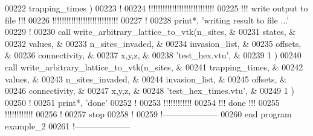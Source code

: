 \begin{DoxyCode}
00222                                           trapping\_times     )
00223 \textcolor{comment}{!}
00224 \textcolor{comment}{!!!!!!!!!!!!!!!!!!!!!!!!!!!!}
00225 \textcolor{comment}{!!! write output to file !!!}
00226 \textcolor{comment}{!!!!!!!!!!!!!!!!!!!!!!!!!!!!}
00227 \textcolor{comment}{!}
00228 print*, \textcolor{stringliteral}{'writing result to file ...'}
00229 \textcolor{comment}{!}
00230 call write\_arbitrary\_lattice\_to\_vtk(n\_sites,         &
00231                                     states,          &
00232                                     values,          &
00233                                     n\_sites\_invaded, &
00234                                     invasion\_list,   &
00235                                     offsets,         &
00236                                     connectivity,    &
00237                                     x,y,z,           &
00238                                     \textcolor{stringliteral}{'test\_hex.vtu'},  &
00239                                     1                )  
00240 call write\_arbitrary\_lattice\_to\_vtk(n\_sites,         &
00241                                     trapping\_times,          &
00242                                     values,          &
00243                                     n\_sites\_invaded, &
00244                                     invasion\_list,   &
00245                                     offsets,         &
00246                                     connectivity,    &
00247                                     x,y,z,           &
00248                                     \textcolor{stringliteral}{'test\_hex\_times.vtu'},  &
00249                                     1                )  
00250 \textcolor{comment}{!}
00251 print*, \textcolor{stringliteral}{'done'}
00252 \textcolor{comment}{!}
00253 \textcolor{comment}{!!!!!!!!!!!!}
00254 \textcolor{comment}{!!! done !!!}
00255 \textcolor{comment}{!!!!!!!!!!!!}
00256 \textcolor{comment}{!}
00257 stop
00258 \textcolor{comment}{!}
00259 \textcolor{comment}{!--------------------}
00260 \textcolor{keyword}{end program example\_2}
00261 \textcolor{comment}{!--------------------}
\end{DoxyCode}
